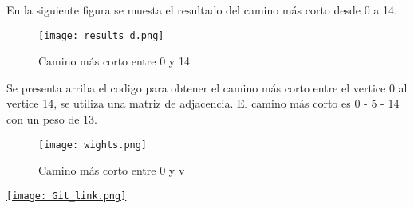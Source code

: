 \documentclass{article}
\begin{document}
\vspace{5mm} %

\vspace{5mm} %

En la siguiente figura se muesta el resultado del camino más corto desde 0 a 14.

\vspace{5mm} %
\begin{figure}[ht]
    \centering
    \texttt{[image: results\_d.png]}
    \caption{Camino más corto entre 0 y 14}
    \label{fig:dijkstra}
\end{figure}
\vspace{5mm} %

Se presenta arriba el codigo para obtener el camino más corto entre el vertice 0 al vertice 14, se utiliza una matriz de adjacencia. \newline
El camino más corto es 0 - 5 - 14 con un peso de 13.
\vspace{5mm} %

\begin{figure}[ht]
    \centering
    \texttt{[image: wights.png]}
    \caption{Camino más corto entre 0 y v}
    \label{fig:dijkstra_weights}
\end{figure}
\vspace{5mm} %

\href{https://github.com/enganthony18/Algorithms}{\texttt{[image: Git\_link.png]}}
\end{document}
